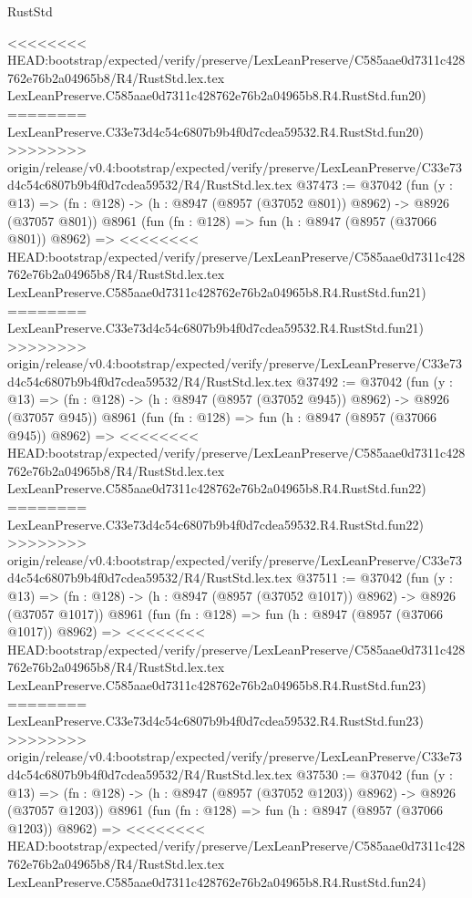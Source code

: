 \begin{lexlean}{RustStd}
\begin{coremodule}
{\begin{coremodule}
{{{{{{{{{{{{{{{{{{{{{{{{{{{{{{{{{{{{{{{<<<<<<<< HEAD:bootstrap/expected/verify/preserve/LexLeanPreserve/C585aae0d7311c428762e76b2a04965b8/R4/RustStd.lex.tex
    LexLeanPreserve.C585aae0d7311c428762e76b2a04965b8.R4.RustStd.fun20)
========
    LexLeanPreserve.C33e73d4c54c6807b9b4f0d7cdea59532.R4.RustStd.fun20)
>>>>>>>> origin/release/v0.4:bootstrap/expected/verify/preserve/LexLeanPreserve/C33e73d4c54c6807b9b4f0d7cdea59532/R4/RustStd.lex.tex
@37473 := @37042
    (fun (y : @13) => (fn : @128) -> (h : @8947 (@8957 (@37052 @801)) @8962) -> @8926 (@37057 @801))
    @8961
    (fun (fn : @128) =>
    fun (h : @8947 (@8957 (@37066 @801)) @8962) =>
<<<<<<<< HEAD:bootstrap/expected/verify/preserve/LexLeanPreserve/C585aae0d7311c428762e76b2a04965b8/R4/RustStd.lex.tex
    LexLeanPreserve.C585aae0d7311c428762e76b2a04965b8.R4.RustStd.fun21)
========
    LexLeanPreserve.C33e73d4c54c6807b9b4f0d7cdea59532.R4.RustStd.fun21)
>>>>>>>> origin/release/v0.4:bootstrap/expected/verify/preserve/LexLeanPreserve/C33e73d4c54c6807b9b4f0d7cdea59532/R4/RustStd.lex.tex
@37492 := @37042
    (fun (y : @13) => (fn : @128) -> (h : @8947 (@8957 (@37052 @945)) @8962) -> @8926 (@37057 @945))
    @8961
    (fun (fn : @128) =>
    fun (h : @8947 (@8957 (@37066 @945)) @8962) =>
<<<<<<<< HEAD:bootstrap/expected/verify/preserve/LexLeanPreserve/C585aae0d7311c428762e76b2a04965b8/R4/RustStd.lex.tex
    LexLeanPreserve.C585aae0d7311c428762e76b2a04965b8.R4.RustStd.fun22)
========
    LexLeanPreserve.C33e73d4c54c6807b9b4f0d7cdea59532.R4.RustStd.fun22)
>>>>>>>> origin/release/v0.4:bootstrap/expected/verify/preserve/LexLeanPreserve/C33e73d4c54c6807b9b4f0d7cdea59532/R4/RustStd.lex.tex
@37511 := @37042
    (fun (y : @13) =>
    (fn : @128) -> (h : @8947 (@8957 (@37052 @1017)) @8962) -> @8926 (@37057 @1017))
    @8961
    (fun (fn : @128) =>
    fun (h : @8947 (@8957 (@37066 @1017)) @8962) =>
<<<<<<<< HEAD:bootstrap/expected/verify/preserve/LexLeanPreserve/C585aae0d7311c428762e76b2a04965b8/R4/RustStd.lex.tex
    LexLeanPreserve.C585aae0d7311c428762e76b2a04965b8.R4.RustStd.fun23)
========
    LexLeanPreserve.C33e73d4c54c6807b9b4f0d7cdea59532.R4.RustStd.fun23)
>>>>>>>> origin/release/v0.4:bootstrap/expected/verify/preserve/LexLeanPreserve/C33e73d4c54c6807b9b4f0d7cdea59532/R4/RustStd.lex.tex
@37530 := @37042
    (fun (y : @13) =>
    (fn : @128) -> (h : @8947 (@8957 (@37052 @1203)) @8962) -> @8926 (@37057 @1203))
    @8961
    (fun (fn : @128) =>
    fun (h : @8947 (@8957 (@37066 @1203)) @8962) =>
<<<<<<<< HEAD:bootstrap/expected/verify/preserve/LexLeanPreserve/C585aae0d7311c428762e76b2a04965b8/R4/RustStd.lex.tex
    LexLeanPreserve.C585aae0d7311c428762e76b2a04965b8.R4.RustStd.fun24)
}}}}}}}}}}}}}}}}}}}}}}}}}}}}}}}}}}}}}}}
\end{coremodule}}
\end{coremodule}
\end{lexlean}
